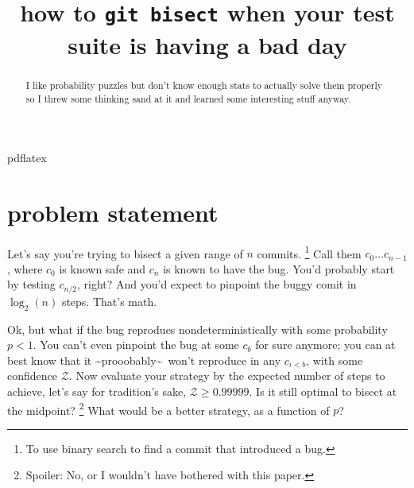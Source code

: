 \documentclass[11pt]{sigplanconf}
\begin{document}
\copyrightdata{}

\title{
how to \texttt{git bisect} when your test suite is having a bad day
}


\maketitle

\begin{abstract}
	I like probability puzzles but don't know enough stats to actually solve them properly
	so I threw some thinking sand at it and learned some interesting stuff anyway.
\end{abstract}


\keywords pdflatex

\newcommand\confidents{\ensuremath{\mathcal{Z}}\xspace}
\newcommand\pdf{\ensuremath{\mathsf{pdf}}\xspace}
\newcommand\cdf{\ensuremath{\mathsf{cdf}}\xspace}

\section{problem statement}

Let's say you're trying to bisect
a given range of $n$ commits.%
\footnote{To use binary search to find a commit that introduced a bug.}
Call them $c_0 \dots c_{n-1}$, where $c_0$ is known safe and $c_n$ is known to have the bug.
You'd probably start by testing $c_{n/2}$, right?
And you'd expect to pinpoint the buggy comit in $\log_2(n)$ steps.
That's math.

Ok, but what if the bug reprodues nondeterministically with some probability $p<1$.
You can't even pinpoint the bug at some $c_{b}$ for sure anymore;
you can at best know
that it \textasciitilde{}prooobably\textasciitilde~won't reproduce in any $c_{i<b}$,
with some confidence $\confidents$.
Now evaluate your strategy by the expected number of steps to achieve, let's say for tradition's sake, $\confidents \ge 0.99999$.
Is it still optimal to bisect at the midpoint?%
\footnote{Spoiler: No, or I wouldn't have bothered with this paper.}
What would be a better strategy, as a function of $p$?
\end{document}
